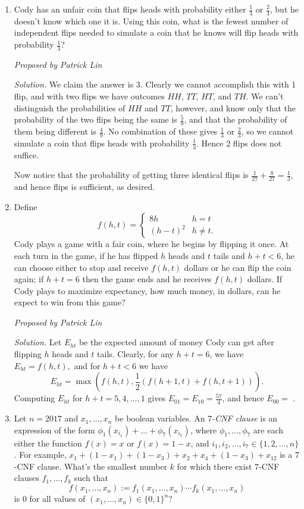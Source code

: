 \documentclass[10pt]{article}
\newcounter{enum}
\newcommand{\proposed}[1]
{
\vspace{5pt}
\noindent\textit{Proposed by #1}
}
\newcommand{\solution}
{
\vspace{5pt}
\noindent\textit{Solution.}\qquad
}
\begin{document}
\begin{enumerate}

\item Cody has an unfair coin that flips heads with probability either $\tfrac13$ or $\tfrac23$, but he doesn't know which one it is. Using this coin, what is the fewest number of independent flips needed to simulate a coin that he knows will flip heads with probability $\tfrac13$?

\proposed{Patrick Lin}

\solution We claim the answer is $\boxed{3}$. Clearly we cannot accomplish this
with 1 flip, and with two flips we have outcomes $HH$, $TT$, $HT$, and $TH$.
We can't distinguish the probabilities of $HH$ and $TT$, however, and know
only that the probability of the two flips being the same is $\tfrac59$, and
that the probability of them being different is $\tfrac49$. No combination
of these gives $\tfrac13$ or $\tfrac23$, so we cannot simulate a coin that
flips heads with probability $\tfrac13$. Hence 2 flips does not suffice.

\par Now notice that the probability of getting three identical flips is
$\tfrac1{27} + \tfrac8{27} = \tfrac13$, and hence  flips is sufficient,
as desired.

\item Define
\[f(h,t) =
\begin{cases}
8h & h = t \\
(h-t)^2 & h \neq t.
\end{cases}\]
Cody plays a game with a fair coin, where he begins by flipping it once. At each turn in the game, if he has flipped $h$ heads and $t$ tails and $h + t < 6$, he can choose either to stop and receive $f(h,t)$ dollars or he can flip the coin again; if $h + t = 6$ then the game ends and he receives $f(h,t)$ dollars. If Cody plays to maximize expectancy, how much money, in dollars, can he expect to win from this game? 

\proposed{Patrick Lin}

\solution Let $E_{ht}$ be the expected amount of money Cody can get after flipping $h$ heads and $t$ tails. Clearly, for any $h + t = 6$, we have $E_{ht} = f(h,t),$ and for $h + t < 6$ we have
\[E_{ht} = \max(f(h,t),\frac12(f(h+1,t)+f(h,t+1))).\]
Computing $E_{ht}$ for $h + t = 5, 4, \dots, 1$ gives $E_{01} = E_{10} = \frac{57}{4}$, and hence $E_{00} =$ . 



\item Let $n=2017$ and $x_1,\dots,x_n$ be boolean variables. An \emph{$7$-CNF clause} is an expression of the form $\phi_1(x_{i_1})+\dots+\phi_7(x_{i_7})$, where $\phi_1,\dots,\phi_7$ are each either the function $f(x)=x$ or $f(x)=1-x$, and $i_1,i_2,\dots,i_7\in\{1,2,\dots,n\}$. For example, $x_1+(1-x_1)+(1-x_3)+x_2+x_4+(1-x_3)+x_{12}$ is a $7$-CNF clause. What's the smallest number $k$ for which there exist $7$-CNF clauses $f_1,\dots,f_k$ such that \[f(x_1,\dots,x_n):=f_1(x_1,\dots,x_n)\cdots f_k(x_1,\dots,x_n)\] is $0$ for all values of $(x_1,\dots,x_n)\in\{0,1\}^n$?


\end{enumerate}
\end{document}
